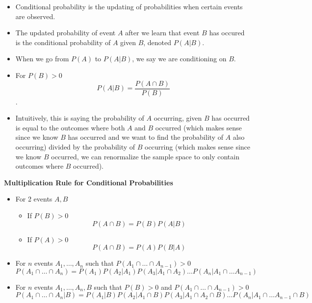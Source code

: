 \documentclass[11pt]{article}
\begin{document}
\begin{itemize}
    \item Conditional probability is the updating of probabilities when certain events are
    observed.
    \item The updated probability of event $A$ after we learn that event $B$ has occured is the
    conditional probability of $A$ given $B$, denoted $P(A|B)$.
    \item When we go from $P(A)$ to $P(A|B)$, we say we are conditioning on $B$.
    \item For $P(B) > 0$ \[P(A|B) = \frac{P(A \cap B)}{P(B)}\].
    \item Intuitively, this is saying the probability of $A$ occurring, given $B$ has occurred
    is equal to the outcomes where both $A$ and $B$ occurred (which makes sense since we know 
    $B$ has occurred and we want to find the probability of $A$ also occurring) divided by the 
    probability of $B$ occurring (which makes sense since we know $B$ occurred, we can 
    renormalize the sample space to only contain outcomes where $B$ occurred).
\end{itemize}

\textbf{Multiplication Rule for Conditional Probabilities}
\begin{itemize}
    \item For 2 events $A,B$
    \begin{itemize}
        \item If $P(B) > 0$ \[P(A \cap B) = P(B)P(A|B)\]
        \item If $P(A) > 0$ \[P(A \cap B) = P(A)P(B|A)\]
    \end{itemize}
    \item For $n$ events $A_1, \ldots, A_n$ such that $P(A_1 \cap \ldots \cap A_{n-1}) > 0$ 
    \[P(A_1 \cap \ldots \cap A_n) = P(A_1)P(A_2|A_1)P(A_3|A_1 \cap A_2) \ldots P(A_n|A_1 \cap
    \ldots A_{n-1})\]
    \item For $n$ events $A_1, \ldots, A_n, B$ such that $P(B) > 0$ and $P(A_1 \cap \ldots \cap
    A_{n-1}) > 0$ 
    \[P(A_1 \cap \ldots \cap A_n|B) = P(A_1|B)P(A_2|A_1 \cap B)P(A_3|A_1 \cap A_2 \cap B) 
    \ldots P(A_n|A_1 \cap \ldots A_{n-1} \cap B)\]
\end{itemize}
\end{document}
